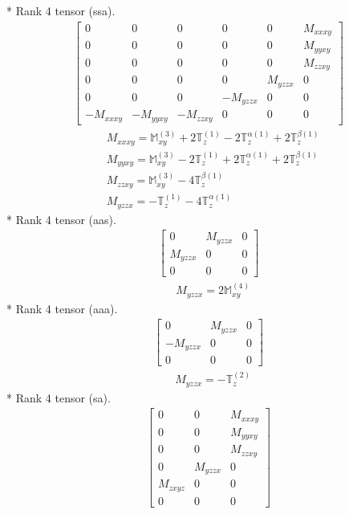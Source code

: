 \documentclass[fleqn,8pt,landscape]{jsarticle}
\begin{document}
* Rank 4 tensor (ssa).
\begin{align*}
\begin{bmatrix} 0 & 0 & 0 & 0 & 0 & M_{xxxy} \\ 0 & 0 & 0 & 0 & 0 & M_{yyxy} \\ 0 & 0 & 0 & 0 & 0 & M_{zzxy} \\ 0 & 0 & 0 & 0 & M_{yzzx} & 0 \\ 0 & 0 & 0 & - M_{yzzx} & 0 & 0 \\ - M_{xxxy} & - M_{yyxy} & - M_{zzxy} & 0 & 0 & 0 \end{bmatrix}
\end{align*}
\begin{align*}
& M_{xxxy} = \mathbb{M}_{xy}^{(3)} + 2 \mathbb{T}_{z}^{(1)} - 2 \mathbb{T}_{z}^{\alpha(1)} + 2 \mathbb{T}_{z}^{\beta(1)} \\
& M_{yyxy} = \mathbb{M}_{xy}^{(3)} - 2 \mathbb{T}_{z}^{(1)} + 2 \mathbb{T}_{z}^{\alpha(1)} + 2 \mathbb{T}_{z}^{\beta(1)} \\
& M_{zzxy} = \mathbb{M}_{xy}^{(3)} - 4 \mathbb{T}_{z}^{\beta(1)} \\
& M_{yzzx} = - \mathbb{T}_{z}^{(1)} - 4 \mathbb{T}_{z}^{\alpha(1)}
\end{align*}
* Rank 4 tensor (aas).
\begin{align*}
\begin{bmatrix} 0 & M_{yzzx} & 0 \\ M_{yzzx} & 0 & 0 \\ 0 & 0 & 0 \end{bmatrix}
\end{align*}
\begin{align*}
& M_{yzzx} = 2 \mathbb{M}_{xy}^{(4)}
\end{align*}
* Rank 4 tensor (aaa).
\begin{align*}
\begin{bmatrix} 0 & M_{yzzx} & 0 \\ - M_{yzzx} & 0 & 0 \\ 0 & 0 & 0 \end{bmatrix}
\end{align*}
\begin{align*}
& M_{yzzx} = - \mathbb{T}_{z}^{(2)}
\end{align*}
* Rank 4 tensor (sa).
\begin{align*}
\begin{bmatrix} 0 & 0 & M_{xxxy} \\ 0 & 0 & M_{yyxy} \\ 0 & 0 & M_{zzxy} \\ 0 & M_{yzzx} & 0 \\ M_{zxyz} & 0 & 0 \\ 0 & 0 & 0 \end{bmatrix}
\end{align*}
\end{document}
